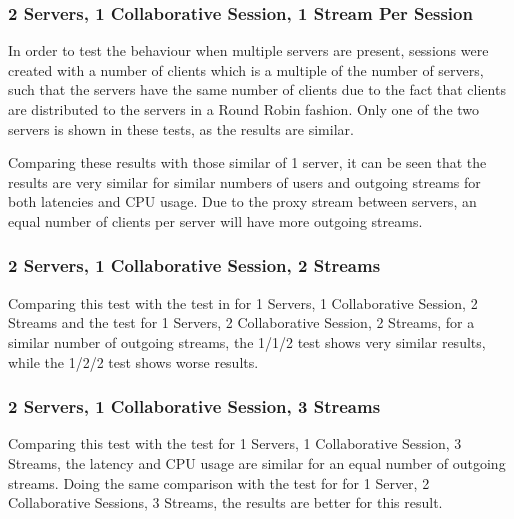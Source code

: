 \subsubsection{2 Servers, 1 Collaborative Session, 1 Stream Per Session}

In order to test the behaviour when multiple servers are present, sessions were created with a number of clients which is a multiple of the number of servers, such that the servers have the same number of clients due to the fact that clients are distributed to the servers in a Round Robin fashion. Only one of the two servers is shown in these tests, as the results are similar.

Comparing these results with those similar of 1 server, it can be seen that the results are very similar for similar numbers of users and outgoing streams for both latencies and CPU usage. Due to the proxy stream between servers, an equal number of clients per server will have more outgoing streams.

\subsubsection{2 Servers, 1 Collaborative Session, 2 Streams}

Comparing this test with the test in for 1 Servers, 1 Collaborative Session, 2 Streams and the test for 1 Servers, 2 Collaborative Session, 2 Streams, for a similar number of outgoing streams, the 1/1/2 test shows very similar results, while the 1/2/2 test shows worse results.

\subsubsection{2 Servers, 1 Collaborative Session, 3 Streams}

Comparing this test with the test for 1 Servers, 1 Collaborative Session, 3 Streams, the latency and CPU usage are similar for an equal number of outgoing streams. Doing the same comparison with the test for for 1 Server, 2 Collaborative Sessions, 3 Streams, the results are better for this result.

